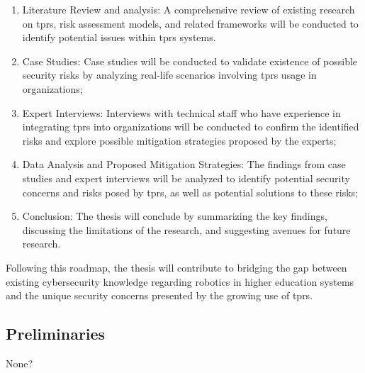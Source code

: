 \begin{enumerate}
  \item Literature Review and analysis: A comprehensive review of existing research on \ac{tprs}, risk assessment models, and related
  frameworks will be conducted to identify potential issues within \ac{tprs} systems.
  \item Case Studies: Case studies will be conducted to validate existence of possible security risks by analyzing real-life scenarios
  involving \ac{tprs} usage in organizations;
  \item Expert Interviews: Interviews with technical staff who have experience in integrating \ac{tprs} into organizations will be
  conducted to confirm the identified risks and explore possible mitigation strategies proposed by the experts;
  \item Data Analysis and Proposed Mitigation Strategies: The findings from case studies and expert interviews will be analyzed to
  identify potential security concerns and risks posed by \ac{tprs}, as well as potential solutions to these risks;
  \item Conclusion: The thesis will conclude by summarizing the key findings, discussing the limitations of the research, and suggesting avenues for future research.
\end{enumerate}
Following this roadmap, the thesis will contribute to bridging the gap between existing cybersecurity knowledge regarding robotics in
higher education systems and the unique security concerns presented by the growing use of \ac{tprs}.



\subsection{Preliminaries}

None?

